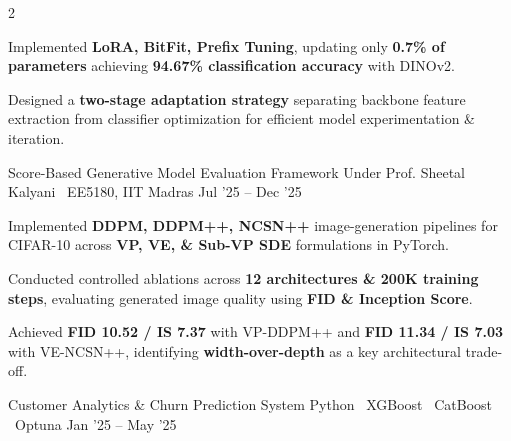 \documentclass{resume}
\begin{document}
\begin{paracol}{2}
{\begin{resumeItemize}
\item Implemented
\textbf{LoRA, BitFit, Prefix Tuning},
updating only \textbf{0.7\% of parameters}
achieving \textbf{94.67\% classification accuracy}
with DINOv2.

\item Designed a
\textbf{two-stage adaptation strategy}
separating backbone feature extraction from classifier optimization
for efficient model experimentation \& iteration.

\end{resumeItemize}
}
{\href{https://github.com/hemanthdatta/tpa-17}{\faGithub}}

\resumeDivider


\resumeProject
{Score-Based Generative Model Evaluation Framework
\href{https://hemanthdatta.github.io/score-based-website/}{\small\faFile}}
{Under Prof. Sheetal Kalyani \textbar\ EE5180, IIT Madras}
{Jul '25 -- Dec '25}
{
\begin{resumeItemize}

\item Implemented
\textbf{DDPM, DDPM++, NCSN++}
image-generation pipelines for CIFAR-10 across
\textbf{VP, VE, \& Sub-VP SDE}
formulations in PyTorch.

\item Conducted controlled ablations across
\textbf{12 architectures \& 200K training steps},
evaluating generated image quality using
\textbf{FID \& Inception Score}.

\item Achieved
\textbf{FID 10.52 / IS 7.37}
with VP-DDPM++ and
\textbf{FID 11.34 / IS 7.03}
with VE-NCSN++, identifying
\textbf{width-over-depth}
as a key architectural trade-off.

\end{resumeItemize}
}
{\href{https://github.com/hemanthdatta/intro-to-ml-project}{\faGithub}}

\resumeDivider


\resumeProject
{Customer Analytics \& Churn Prediction System}
{Python \textbar\ XGBoost \textbar\ CatBoost \textbar\ Optuna}
{Jan '25 -- May '25}
{
\begin{resumeItemize}


\end{resumeItemize}}
\end{paracol}
\end{document}
